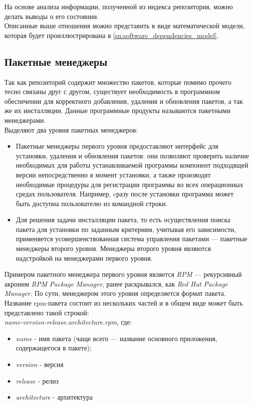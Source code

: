 На основе анализа информации, полученной из индекса репозитория,
можно делать выводы о его состоянии. \\

Описанные выше отношения можно представить в виде математической модели,
которая будет проиллюстрирована в \ref{sn:software_dependencies_model}.


\subsection{Пакетные менеджеры}
Так как репозиторий содержит множество пакетов, которые помимо прочего тесно
связаны друг с другом, существует необходимость в программном обеспечении для
корректного добавления, удаления и обновления пакетов, а так же их инсталляции.
Данные программные продукты называются пакетными менеджерами.\\

Выделяют два уровня пакетных менеджеров:
\begin{itemize}
\item{Пакетные менеджеры первого уровня предоставляют интерфейс для установки,
удаления и обновления пакетов: они позволяют проверить наличие необходимых для
работы устанавливаемой программы компонент подходящей версии непосредственно 
в момент установки, а также производят необходимые процедуры для регистрации 
программы во всех операционных средах пользователя. Например, cразу после установки 
программа может быть доступна пользователю из командной строки.}
\item{Для решения задачи инсталляции пакета, то есть осуществления поиска пакета для
установки по заданным критериям, учитывая его зависимости, применяется усовершенствованная
система управления пакетами --- пакетные менеджеры второго уровня. Менеджеры второго уровня 
являются надстройкой на менеджерами первого уровня.}
\end{itemize}

Примером пакетного менеджера первого уровня является  \textit{RPM} --- рекурсивный акроним 
\textit{RPM Package Manager}, ранее раскрывался, как \textit{Red Hat Package Manager}.
По сути, менеджером этого уровня определяется формат пакета.\\

Название rpm-пакета состоит из нескольких частей и в общем виде может быть представлено
такой строкой: \\
\textit{name-version-release.architecture.rpm}, где:
\begin{itemize}
\item{\textit{name} - имя пакета (чаще всего --- название основного приложения, содержащегося в пакете);}
\item{\textit{version} - версия}
\item{\textit{release} - релиз}
\item{\textit{architecture} - архитектура}
\end{itemize}

